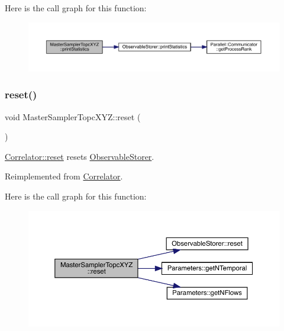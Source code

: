 Here is the call graph for this function\+:
\nopagebreak
\begin{figure}[H]
\begin{center}
\leavevmode
\includegraphics[width=350pt]{class_master_sampler_topc_x_y_z_a5a34a7f90ce8eea6c0efa06cfdfeb5f1_cgraph}
\end{center}
\end{figure}
\mbox{\label{class_master_sampler_topc_x_y_z_aef8d0b1b431711c6410cfece1c007b4a}} 
\subsubsection{\texorpdfstring{reset()}{reset()}}
{\footnotesize\ttfamily void Master\+Sampler\+Topc\+X\+Y\+Z\+::reset (\begin{DoxyParamCaption}{ }\end{DoxyParamCaption})\hspace{0.3cm}{\ttfamily [virtual]}}



\mbox{\hyperlink{class_correlator_aacca40262d2cd62f0a3964e832f948c1}{Correlator\+::reset}} resets \mbox{\hyperlink{class_observable_storer}{Observable\+Storer}}. 



Reimplemented from \mbox{\hyperlink{class_correlator_aacca40262d2cd62f0a3964e832f948c1}{Correlator}}.

Here is the call graph for this function\+:
\nopagebreak
\begin{figure}[H]
\begin{center}
\leavevmode
\includegraphics[width=350pt]{class_master_sampler_topc_x_y_z_aef8d0b1b431711c6410cfece1c007b4a_cgraph}
\end{center}
\end{figure}
\mbox{\label{class_master_sampler_topc_x_y_z_af748653ded9908f78383185475b9ddeb}} 
